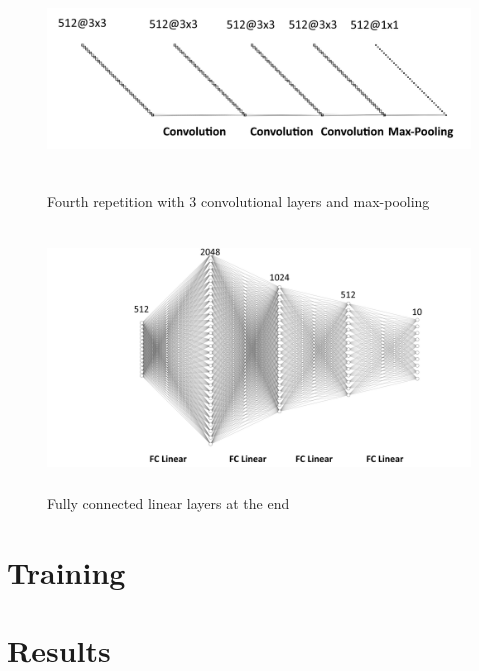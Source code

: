 \documentclass{tubaf-article}
\begin{document}
	\begin{figure}[htp]
		\centering
		\begin{minipage}{\textwidth}
			\centering
			\includegraphics[width=\textwidth, height=5cm]{final5.png}
			\caption{Fourth repetition with 3 convolutional layers and max-pooling}
		\end{minipage}
		
		\begin{minipage}{\textwidth}
			\centering
			\includegraphics[width=\textwidth, height=7cm]{final6.png}
			\caption{Fully connected linear layers at the end}
		\end{minipage}
	\end{figure}
	
	
	
	\section{Training}
	\label{training}
	
	\section{Results}
	\label{results}
	
	
\end{document}
